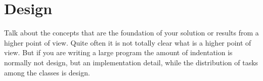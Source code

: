 
\chapter{Design} 
\label{Chapter3} 

Talk about the concepts that are the foundation of your solution
or results from a higher point of view.
Quite often it is not totally clear what is a higher point of
view. But if you are writing a large program the amount 
of indentation is normally not design, but an implementation detail,
while the distribution of tasks among the classes is design.


